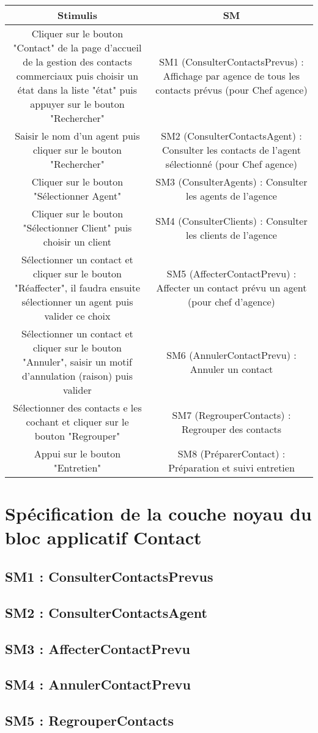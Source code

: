 \begin{tabular}{|c|c|}
\hline
Stimulis 
& SM \\
\hline
Cliquer sur le bouton "Contact" de la page d'accueil de la gestion des contacts commerciaux puis choisir un état dans la liste "état" puis appuyer sur le bouton "Rechercher"
& SM1 (ConsulterContactsPrevus) : Affichage par agence de tous les contacts prévus (pour Chef agence)\\
\hline
Saisir le nom d'un agent puis cliquer sur le bouton "Rechercher"
& SM2 (ConsulterContactsAgent) : Consulter les contacts de l'agent sélectionné (pour Chef agence)\\
\hline
Cliquer sur le bouton "Sélectionner Agent"
& SM3 (ConsulterAgents) : Consulter les agents de l'agence\\
\hline
Cliquer sur le bouton "Sélectionner Client" puis choisir un client
& SM4 (ConsulterClients) : Consulter les clients de l'agence\\
\hline
Sélectionner un contact et cliquer sur le bouton "Réaffecter", il faudra ensuite sélectionner un agent puis valider ce choix
& SM5 (AffecterContactPrevu) : Affecter un contact prévu un agent (pour chef d'agence)\\
\hline
Sélectionner un contact et cliquer sur le bouton "Annuler", saisir un motif d'annulation (raison) puis valider
& SM6 (AnnulerContactPrevu) : Annuler un contact\\
\hline
Sélectionner des contacts e les cochant et cliquer sur le bouton "Regrouper"
& SM7 (RegrouperContacts) : Regrouper des contacts\\
\hline
Appui sur le bouton "Entretien"
& SM8 (PréparerContact) : Préparation et suivi entretien\\
\hline
\end{tabular}


\section{Spécification de la couche noyau du bloc applicatif Contact}

       \subsection{SM1 : ConsulterContactsPrevus}

       \subsection{SM2 : ConsulterContactsAgent}

       \subsection{SM3 : AffecterContactPrevu}

       \subsection{SM4 : AnnulerContactPrevu}

       \subsection{SM5 : RegrouperContacts}